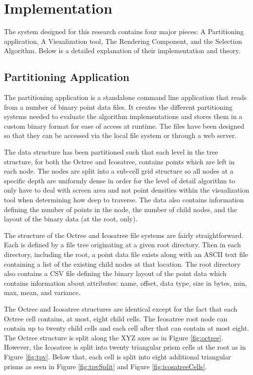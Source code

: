 \chapter{Implementation}

The system designed for this research contains four major pieces: A Partitioning
application, A Visualization tool, The Rendering Component, and the Selection
Algorithm. Below is a detailed explanation of their implementation and theory.

\section{Partitioning Application}

The partitioning application is a standalone command line application that reads
from a number of binary point data files. It creates the different partitioning
systems needed to evaluate the algorithm implementations and stores them in a
custom binary format for ease of access at runtime. The files have been designed
so that they can be accessed via the local file system or through a web server.

The data structure has been partitioned such that each level in the tree
structure, for both the Octree and Icosatree, contains points which are left in
each node. The nodes are split into a sub-cell grid structure so all nodes at a
specific depth are uniformly dense in order for the level of detail algorithm to
only have to deal with screen area and not point densities within the
visualization tool when determining how deep to traverse. The data also contains
information defining the number of points in the node, the number of child
nodes, and the layout of the binary data (at the root, only).

The structure of the Octree and Icosatree file systems are fairly
straightforward. Each is defined by a file tree originating at a given root
directory. Then in each directory, including the root, a point data file exists
along with an ASCII text file containing a list of the existing child nodes at
that location. The root directory also contains a CSV file defining the binary
layout of the point data which contains information about attributes: name,
offset, data type, size in bytes, min, max, mean, and variance.

The Octree and Icosatree structures are identical except for the fact that each
Octree cell contains, at most, eight child cells. The Icosatree root node can
contain up to twenty child cells and each cell after that can contain at most
eight. The Octree structure is split along the XYZ axes as in Figure
\ref{fig:octree}. However, the Icosatree is split into twenty triangular prism
cells at the root as in Figure \ref{fig:tpv}. Below that, each cell is split
into eight additional triangular prisms as seen in Figure \ref{fig:tpvSplit} and
Figure \ref{fig:icosatreeCells}.

